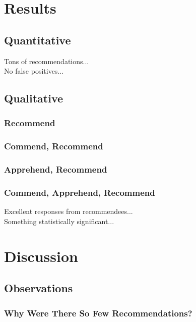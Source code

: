 \documentclass[sigconf,review,anonymous]{acmart}
\begin{document}
\section{Results}

\subsection{Quantitative}

Tons of recommendations... \\

No false positives...

\subsection{Qualitative}

\subsubsection{Recommend}

\subsubsection{Commend, Recommend}

\subsubsection{Apprehend, Recommend}

\subsubsection{Commend, Apprehend, Recommend}

Excellent responses from recommendees...\\

Something statistically significant...

\section{Discussion}

\subsection{Observations}

\subsubsection{Why Were There So Few Recommendations?}
\end{document}
